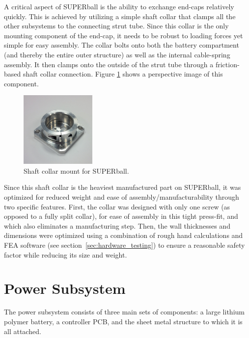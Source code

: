 \documentclass[12pt]{report}
\begin{document}
A critical aspect of SUPERball is the ability to exchange end-caps relatively quickly.
This is achieved by utilizing a simple shaft collar that clamps all the other subsystems to the connecting strut tube.
Since this collar is the only mounting component of the end-cap, it needs to be robust to loading forces yet simple for easy assembly.
The collar bolts onto both the battery compartment (and thereby the entire outer structure) as well as the internal cable-spring assembly.
It then clamps onto the outside of the strut tube through a friction-based shaft collar connection.
Figure \ref{fig:redesigned_shaft_collar} shows a perspective image of this component.

\begin{figure}
  \begin{center}
    \includegraphics[width=0.33\textwidth]{img/redesigned_shaft_collar}
    \caption{Shaft collar mount for SUPERball.}
    \label{fig:redesigned_shaft_collar}
  \end{center}
\end{figure}

Since this shaft collar is the heaviest manufactured part on SUPERball, it was optimized for reduced weight and ease of assembly/manufacturability through two specific features.
First, the collar was designed with only one screw (as opposed to a fully split collar), for ease of assembly in this tight press-fit, and which also eliminates a manufacturing step.
Then, the wall thicknesses and dimensions were optimized using a combination of rough hand calculations and FEA software (see section~\ref{sec:hardware_testing}) to ensure a reasonable safety factor while reducing its size and weight.

\section{Power Subsystem}

The power subsystem consists of three main sets of components: a large lithium polymer battery, a controller PCB, and the sheet metal structure to which it is all attached.
\end{document}
